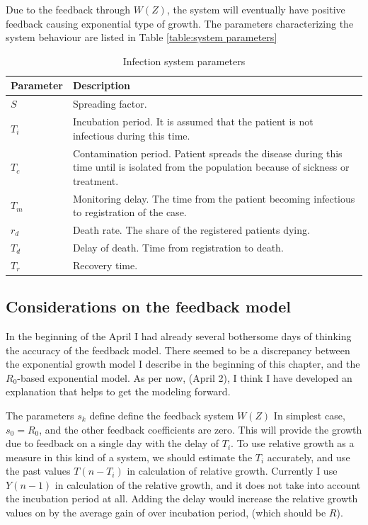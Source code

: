 Due to the feedback through $W(Z)$, the system will eventually have positive
feedback causing exponential type of growth. The parameters characterizing the
system behaviour are listed in Table \ref{table:system parameters}
\begin{table}
    \centering
    \caption{Infection system parameters}
    \begin{tabular}{l|p{10cm}}
        \textbf{Parameter} & \textbf{Description} \\
        \hline
        $S$ & Spreading factor.\\
        $T_i$ & Incubation period. It is assumed that the patient is not
        infectious during this time. \\
        $T_c$ & Contamination period. Patient spreads the disease during this
        time until is isolated from the population because of sickness or
        treatment.\\
        $T_m$ & Monitoring delay. The time from the patient becoming
        infectious to registration of the case.\\
        $r_d$ & Death rate. The share of the registered patients dying.\\
        $T_d$ & Delay of death. Time from registration to death.\\
        $T_r$ & Recovery time.
    \end{tabular}
    \label{tab:system_parameters}
\end{table}

\subsection{Considerations on the feedback model}
In the beginning of the  April I had already several bothersome days of
thinking the accuracy of the  feedback model. There seemed to be a
discrepancy between the exponential growth model I describe in the beginning
of this chapter, and the $R_0$-based exponential model. As per now, (April 2), I
think I have developed an explanation that helps to get the modeling forward.

The parameters $s_k$ define define the feedback system $W(Z)$ In simplest case,
$s_0=R_0$, and the other feedback coefficients are zero. This will provide
the growth due to feedback on a single day with the delay of $T_i$. To use
relative growth as a measure in this kind of a system, we should estimate the
$T_i$ accurately, and use the past values $T\left(n-T_i\right)$ in calculation
of relative growth. Currently I use $Y\left(n-1\right)$ in calculation of the
relative growth, and it does not take into account the incubation period at
all. Adding the delay would increase the relative growth values on by the
average gain of over incubation period, (which should be $R$). 

